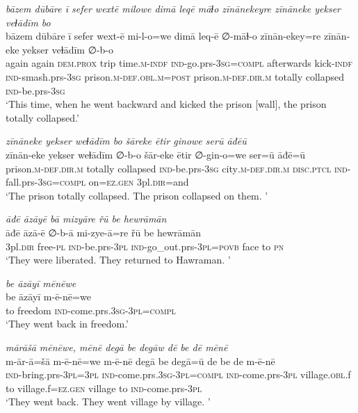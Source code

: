\ea \label{BP.173}
\textit{bāzem dūbāre ī sefer wextē milowe dimā leqē māɫo zīnānekeyre zīnāneke yekser veɫādīm bo} \\ 
\gll bāzem dūbāre ī sefer wext-ē mi-l-o=we dimā leq-ē ∅-māɫ-o zīnān-ekey=re zīnān-eke yekser veɫādīm ∅-b-o \\ 
 again again \textsc{dem.prox} trip time\textsc{.m}\textsc{-indf} \textsc{ind-}go.prs\textsc{-3sg}\textsc{=compl} afterwards kick\textsc{-indf} \textsc{ind-}smash.prs\textsc{-3sg} prison\textsc{.m}\textsc{-def}\textsc{.obl}\textsc{.m}\textsc{=\textsc{post}} prison\textsc{.m}\textsc{-def}\textsc{.dir}\textsc{.m} totally collapsed \textsc{ind-}be.prs\textsc{-3sg} \\ 
\glt `This time, when he went backward and kicked the prison [wall], the prison totally collapsed.'
\z 
 
\ea \label{BP.174}
\textit{zīnāneke yekser weɫādīm bo šāreke ētir ginowe serū āđēū} \\ 
\gll zīnān-eke yekser weɫādīm ∅-b-o šār-eke ētir ∅-gin-o=we ser=ū āđē=ū \\ 
 prison\textsc{.m}\textsc{-def}\textsc{.dir}\textsc{.m} totally collapsed \textsc{ind-}be.prs\textsc{-3sg} city\textsc{.m}\textsc{-def}\textsc{.dir}\textsc{.m} \textsc{disc.ptcl} \textsc{ind-}fall.prs\textsc{-3sg}\textsc{=compl} on\textsc{=ez.gen} 3pl\textsc{.dir}=and \\ 
\glt `The prison totally collapsed. The prison collapsed on them. '
\z 
 
\ea \label{BP.175}
\textit{āđē āzāyē bā mizyāre řū be hewrāmān} \\ 
\gll āđē āzā-ē ∅-b-ā mi-zye-ā=re řū be hewrāmān \\ 
 3pl\textsc{.dir} free\textsc{\textsc{-pl}} \textsc{ind-}be.prs\textsc{-3pl} \textsc{ind-}go\_out.prs\textsc{-3pl}\textsc{=\textsc{povb}} face to \textsc{pn} \\ 
\glt `They were liberated. They returned to Hawraman. '
\z 
 
\ea \label{BP.176}
\textit{be āzāyī mēnēwe} \\ 
\gll be āzāyī m-ē-nē=we \\ 
 to freedom \textsc{ind-}come.prs\textsc{.3sg}\textsc{-3pl}\textsc{=compl} \\ 
\glt `They went back in freedom.'
\z 
 
\ea \label{BP.177}
\textit{mārāšā mēnēwe, mēnē degā be degāw dē be dē mēnē} \\ 
\gll m-ār-ā=šā m-ē-nē=we m-ē-nē degā be degā=ū de be de m-ē-nē \\ 
 \textsc{ind-}bring.prs\textsc{-3pl}\textsc{=3pl} \textsc{ind-}come.prs\textsc{.3sg}\textsc{-3pl}\textsc{=compl} \textsc{ind-}come.prs\textsc{-3pl} village\textsc{.obl}.f to village.f\textsc{=ez.gen} village to \textsc{ind-}come.prs\textsc{-3pl} \\ 
\glt `They went back. They went village by village. '
\z 
 
